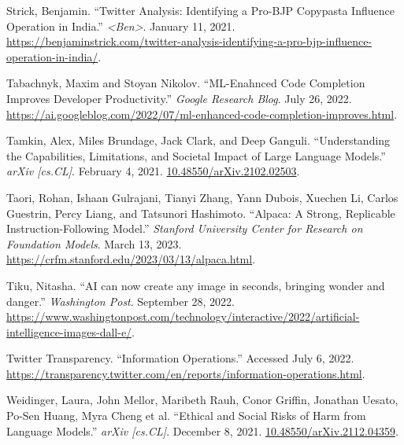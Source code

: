 \documentclass{article}
\begin{document}
\begin{thebibliography}{9}
  Strick, Benjamin. ``Twitter Analysis: Identifying a Pro-BJP Copypasta Influence Operation in India.'' \textit{<Ben>}. January 11, 2021. \href{https://benjaminstrick.com/twitter-analysis-identifying-a-pro-bjp-influence-operation-in-india/}{https://benjaminstrick.com/twitter-analysis-identifying-a-pro-bjp-influence-operation-in-india/}. 

  Tabachnyk, Maxim and Stoyan Nikolov. ``ML-Enahnced Code Completion Improves Developer Productivity.'' \textit{Google Research Blog}. July 26, 2022. \href{https://ai.googleblog.com/2022/07/ml-enhanced-code-completion-improves.html}{https://ai.googleblog.com/2022/07/ml-enhanced-code-completion-improves.html}. 

  Tamkin, Alex, Miles Brundage, Jack Clark, and Deep Ganguli. ``Understanding the Capabilities, Limitations, and Societal Impact of Large Language Models.'' \textit{arXiv [cs.CL]}. February 4, 2021. \href{https://doi.org/10.48550/arXiv.2102.02503}{10.48550/arXiv.2102.02503}.

  Taori, Rohan, Ishaan Gulrajani, Tianyi Zhang, Yann Dubois, Xuechen Li, Carlos Guestrin, Percy Liang, and Tatsunori Hashimoto. ``Alpaca: A Strong, Replicable Instruction-Following Model.'' \textit{Stanford University Center for Research on Foundation Models}. March 13, 2023. \href{https://crfm.stanford.edu/2023/03/13/alpaca.html}{https://crfm.stanford.edu/2023/03/13/alpaca.html}. 

  Tiku, Nitasha. ``AI can now create any image in seconds, bringing wonder and danger.'' \textit{Washington Post}. September 28, 2022. \href{https://www.washingtonpost.com/technology/interactive/2022/artificial-intelligence-images-dall-e/}{https://www.washingtonpost.com/technology/interactive/2022/artificial-intelligence-images-dall-e/}.

  Twitter Transparency. ``Information Operations.'' Accessed July 6, 2022. \href{https://transparency.twitter.com/en/reports/information-operations.html}{https://transparency.twitter.com/en/reports/information-operations.html}.

  Weidinger, Laura, John Mellor, Maribeth Rauh, Conor Griffin, Jonathan Uesato, Po-Sen Huang, Myra Cheng et al. ``Ethical and Social Risks of Harm from Language Models.'' \textit{arXiv [cs.CL]}. December 8, 2021. \href{https://arxiv.org/abs/2112.04359}{10.48550/arXiv.2112.04359}.
  
\end{thebibliography}
\end{document}

